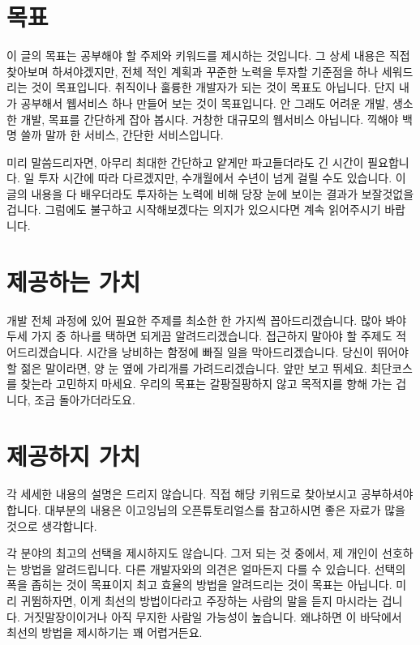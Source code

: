 \documentclass[11pt,a4paper]{article}
\begin{document}
\section{목표}
이 글의 목표는 공부해야 할 주제와 키워드를 제시하는 것입니다. 그 상세 내용은 직접 찾아보며 하셔야겠지만, 전체 적인 계획과 꾸준한 노력을 투자할 기준점을 하나 세워드리는 것이 목표입니다. 취직이나 훌륭한 개발자가 되는 것이 목표도 아닙니다. 단지 내가 공부해서 웹서비스 하나 만들어 보는 것이 목표입니다. 안 그래도 어려운 개발, 생소한 개발, 목표를 간단하게 잡아 봅시다. 거창한 대규모의 웹서비스 아닙니다. 끽해야 백 명 쓸까 말까 한 서비스, 간단한 서비스입니다.

미리 말씀드리자면, 아무리 최대한 간단하고 얕게만 파고들더라도 긴 시간이 필요합니다. 일 투자 시간에 따라 다르겠지만, 수개월에서 수년이 넘게 걸릴 수도 있습니다. 이 글의 내용을 다 배우더라도 투자하는 노력에 비해 당장 눈에 보이는 결과가 보잘것없을 겁니다. 그럼에도 불구하고 시작해보겠다는 의지가 있으시다면 계속 읽어주시기 바랍니다.


\section{제공하는 가치}
개발 전체 과정에 있어 필요한 주제를 최소한 한 가지씩 꼽아드리겠습니다. 많아 봐야 두세 가지 중 하나를 택하면 되게끔 알려드리겠습니다. 접근하지 말아야 할 주제도 적어드리겠습니다. 시간을 낭비하는 함정에 빠질 일을 막아드리겠습니다. 당신이 뛰어야 할 젊은 말이라면, 양 눈 옆에 가리개를 가려드리겠습니다. 앞만 보고 뛰세요. 최단코스를 찾는라 고민하지 마세요. 우리의 목표는 갈팡질팡하지 않고 목적지를 향해 가는 겁니다, 조금 돌아가더라도요.

\section{제공하지  가치}
각 세세한 내용의 설명은 드리지 않습니다. 직접 해당 키워드로 찾아보시고 공부하셔야 합니다. 대부분의 내용은 이고잉님의 오픈튜토리얼스를 참고하시면 좋은 자료가 많을 것으로 생각합니다.

각 분야의 최고의 선택을 제시하지도 않습니다. 그저 되는 것 중에서, 제 개인이 선호하는 방법을 알려드립니다. 다른 개발자와의 의견은 얼마든지 다를 수 있습니다. 선택의 폭을 좁히는 것이 목표이지 최고 효율의 방법을 알려드리는 것이 목표는 아닙니다. 미리 귀뜀하자면, 이게 최선의 방법이다라고 주장하는 사람의 말을 듣지 마시라는 겁니다. 거짓말장이이거나 아직 무지한 사람일 가능성이 높습니다. 왜냐하면 이 바닥에서 최선의 방법을 제시하기는 꽤 어렵거든요.
\end{document}
